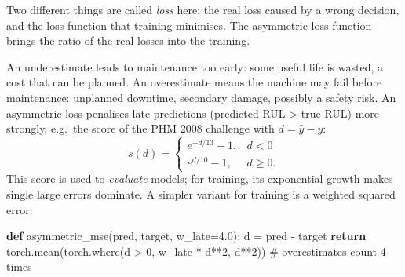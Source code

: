 \documentclass[
  letterpaper,
  DIV=11,
  numbers=noendperiod]{scrreprt}
\newenvironment{Shaded}{\begin{snugshade}}{\end{snugshade}}
\newcommand{\CommentTok}[1]{\textcolor[rgb]{0.37,0.37,0.37}{#1}}
\newcommand{\ControlFlowTok}[1]{\textcolor[rgb]{0.00,0.23,0.31}{\textbf{#1}}}
\newcommand{\DecValTok}[1]{\textcolor[rgb]{0.68,0.00,0.00}{#1}}
\newcommand{\FloatTok}[1]{\textcolor[rgb]{0.68,0.00,0.00}{#1}}
\newcommand{\KeywordTok}[1]{\textcolor[rgb]{0.00,0.23,0.31}{\textbf{#1}}}
\newcommand{\NormalTok}[1]{\textcolor[rgb]{0.00,0.23,0.31}{#1}}
\newcommand{\OperatorTok}[1]{\textcolor[rgb]{0.37,0.37,0.37}{#1}}
\begin{document}
\begin{tcolorbox}[enhanced jigsaw, left=2mm, title=\textcolor{quarto-callout-caution-color}{\faFire}\hspace{0.5em}{Solution to Exercise 3}, opacityback=0, breakable, rightrule=.15mm, arc=.35mm, toptitle=1mm, colbacktitle=quarto-callout-caution-color!10!white, opacitybacktitle=0.6, coltitle=black, colframe=quarto-callout-caution-color-frame, bottomrule=.15mm, leftrule=.75mm, bottomtitle=1mm, titlerule=0mm, toprule=.15mm, colback=white]

Two different things are called \emph{loss} here: the real loss caused
by a wrong decision, and the loss function that training minimises. The
asymmetric loss function brings the ratio of the real losses into the
training.

An underestimate leads to maintenance too early: some useful life is
wasted, a cost that can be planned. An overestimate means the machine
may fail before maintenance: unplanned downtime, secondary damage,
possibly a safety risk. An asymmetric loss penalises late predictions
(predicted RUL \textgreater{} true RUL) more strongly, e.g.~the score of
the PHM 2008 challenge with \(d = \hat y - y\):
\[s(d) = \begin{cases} e^{-d/13} - 1, & d < 0 \\ e^{d/10} - 1, & d \ge 0. \end{cases}\]
This score is used to \emph{evaluate} models; for training, its
exponential growth makes single large errors dominate. A simpler variant
for training is a weighted squared error:

\begin{Shaded}
\begin{Highlighting}[]
\KeywordTok{def}\NormalTok{ asymmetric\_mse(pred, target, w\_late}\OperatorTok{=}\FloatTok{4.0}\NormalTok{):}
\NormalTok{    d }\OperatorTok{=}\NormalTok{ pred }\OperatorTok{{-}}\NormalTok{ target}
    \ControlFlowTok{return}\NormalTok{ torch.mean(torch.where(d }\OperatorTok{\textgreater{}} \DecValTok{0}\NormalTok{, w\_late }\OperatorTok{*}\NormalTok{ d}\OperatorTok{**}\DecValTok{2}\NormalTok{, d}\OperatorTok{**}\DecValTok{2}\NormalTok{))   }\CommentTok{\# overestimates count 4 times}


\end{Highlighting}
\end{Shaded}
\end{tcolorbox}
\end{document}
